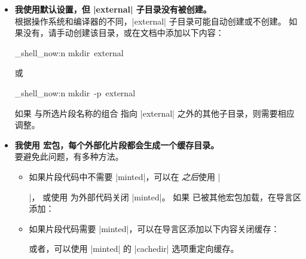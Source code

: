 \begin{itemize}

\item\textbf{我使用默认设置，但 |external| 子目录没有被创建。}\\
  根据操作系统和编译器的不同，|external| 子目录可能自动创建或不创建。
  如果没有，请手动创建该目录，或在文档中添加以下内容：
\begin{dispListing}
\ExplSyntaxOn
\sys_shell_now:n { mkdir~external }
\ExplSyntaxOff
\end{dispListing}
或
\begin{dispListing}
\ExplSyntaxOn
\sys_shell_now:n { mkdir~-p~external }
\ExplSyntaxOff
\end{dispListing}
  如果  与所选片段名称的组合
  指向 |external| 之外的其他子目录，则需要相应调整。

\item\textbf{我使用  宏包，每个外部化片段都会生成一个缓存目录。}\\
  要避免此问题，有多种方法。
  \begin{itemize}
  \item 如果片段代码中不需要 |minted|，可以在 
    \emph{之后}使用 |\usepackage{minted}|，
    或使用  为外部代码关闭 |minted|。
    如果  已被其他宏包加载，在导言区添加：
\begin{dispListing}
\end{dispListing}
  \item 如果片段代码需要 |minted|，可以在导言区添加以下内容关闭缓存：
\begin{dispListing}
\end{dispListing}
  或者，可以使用 |minted| 的 |cachedir| 选项重定向缓存。
  \end{itemize}


\end{itemize}

